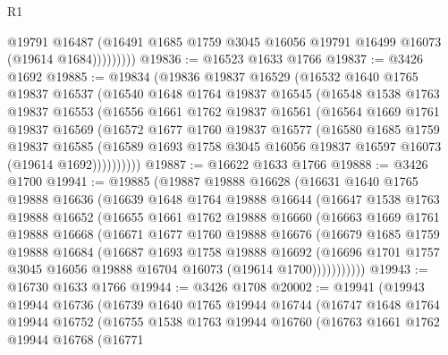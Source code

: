 \begin{lexlean}{R1}
\begin{coremodule}
                  @19791
                  @16487
                  (@16491 @1685 @1759 @3045 @16056 @19791 @16499 @16073 (@19614 @1684)))))))))
@19836 := @16523 @1633 @1766
@19837 := @3426 @1692
@19885 := @19834
    (@19836
      @19837
      @16529
      (@16532
        @1640
        @1765
        @19837
        @16537
        (@16540
          @1648
          @1764
          @19837
          @16545
          (@16548
            @1538
            @1763
            @19837
            @16553
            (@16556
              @1661
              @1762
              @19837
              @16561
              (@16564
                @1669
                @1761
                @19837
                @16569
                (@16572
                  @1677
                  @1760
                  @19837
                  @16577
                  (@16580
                    @1685
                    @1759
                    @19837
                    @16585
                    (@16589 @1693 @1758 @3045 @16056 @19837 @16597 @16073 (@19614 @1692))))))))))
@19887 := @16622 @1633 @1766
@19888 := @3426 @1700
@19941 := @19885
    (@19887
      @19888
      @16628
      (@16631
        @1640
        @1765
        @19888
        @16636
        (@16639
          @1648
          @1764
          @19888
          @16644
          (@16647
            @1538
            @1763
            @19888
            @16652
            (@16655
              @1661
              @1762
              @19888
              @16660
              (@16663
                @1669
                @1761
                @19888
                @16668
                (@16671
                  @1677
                  @1760
                  @19888
                  @16676
                  (@16679
                    @1685
                    @1759
                    @19888
                    @16684
                    (@16687
                      @1693
                      @1758
                      @19888
                      @16692
                      (@16696 @1701 @1757 @3045 @16056 @19888 @16704 @16073 (@19614 @1700)))))))))))
@19943 := @16730 @1633 @1766
@19944 := @3426 @1708
@20002 := @19941
    (@19943
      @19944
      @16736
      (@16739
        @1640
        @1765
        @19944
        @16744
        (@16747
          @1648
          @1764
          @19944
          @16752
          (@16755
            @1538
            @1763
            @19944
            @16760
            (@16763
              @1661
              @1762
              @19944
              @16768
              (@16771

\end{coremodule}
\end{lexlean}
